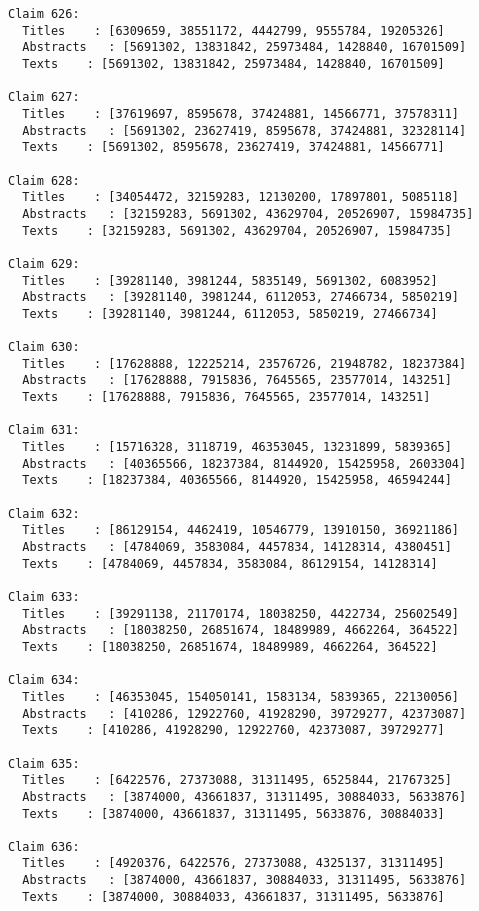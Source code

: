 \documentclass[11pt]{article}
\begin{document}
\begin{Verbatim}[commandchars=\\\{\}]
Claim 626:
  Titles    : [6309659, 38551172, 4442799, 9555784, 19205326]
  Abstracts   : [5691302, 13831842, 25973484, 1428840, 16701509]
  Texts    : [5691302, 13831842, 25973484, 1428840, 16701509]

Claim 627:
  Titles    : [37619697, 8595678, 37424881, 14566771, 37578311]
  Abstracts   : [5691302, 23627419, 8595678, 37424881, 32328114]
  Texts    : [5691302, 8595678, 23627419, 37424881, 14566771]

Claim 628:
  Titles    : [34054472, 32159283, 12130200, 17897801, 5085118]
  Abstracts   : [32159283, 5691302, 43629704, 20526907, 15984735]
  Texts    : [32159283, 5691302, 43629704, 20526907, 15984735]

Claim 629:
  Titles    : [39281140, 3981244, 5835149, 5691302, 6083952]
  Abstracts   : [39281140, 3981244, 6112053, 27466734, 5850219]
  Texts    : [39281140, 3981244, 6112053, 5850219, 27466734]

Claim 630:
  Titles    : [17628888, 12225214, 23576726, 21948782, 18237384]
  Abstracts   : [17628888, 7915836, 7645565, 23577014, 143251]
  Texts    : [17628888, 7915836, 7645565, 23577014, 143251]

Claim 631:
  Titles    : [15716328, 3118719, 46353045, 13231899, 5839365]
  Abstracts   : [40365566, 18237384, 8144920, 15425958, 2603304]
  Texts    : [18237384, 40365566, 8144920, 15425958, 46594244]

Claim 632:
  Titles    : [86129154, 4462419, 10546779, 13910150, 36921186]
  Abstracts   : [4784069, 3583084, 4457834, 14128314, 4380451]
  Texts    : [4784069, 4457834, 3583084, 86129154, 14128314]

Claim 633:
  Titles    : [39291138, 21170174, 18038250, 4422734, 25602549]
  Abstracts   : [18038250, 26851674, 18489989, 4662264, 364522]
  Texts    : [18038250, 26851674, 18489989, 4662264, 364522]

Claim 634:
  Titles    : [46353045, 154050141, 1583134, 5839365, 22130056]
  Abstracts   : [410286, 12922760, 41928290, 39729277, 42373087]
  Texts    : [410286, 41928290, 12922760, 42373087, 39729277]

Claim 635:
  Titles    : [6422576, 27373088, 31311495, 6525844, 21767325]
  Abstracts   : [3874000, 43661837, 31311495, 30884033, 5633876]
  Texts    : [3874000, 43661837, 31311495, 5633876, 30884033]

Claim 636:
  Titles    : [4920376, 6422576, 27373088, 4325137, 31311495]
  Abstracts   : [3874000, 43661837, 30884033, 31311495, 5633876]
  Texts    : [3874000, 30884033, 43661837, 31311495, 5633876]


\end{Verbatim}
\end{document}
